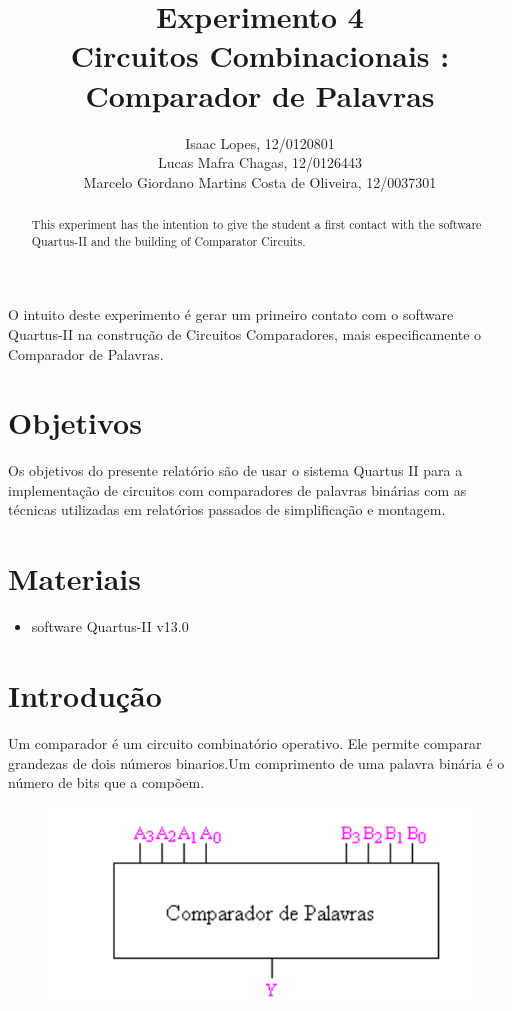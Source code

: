 \documentclass[12pt]{article}
\title{Experimento 4\\
	Circuitos Combinacionais : Comparador de Palavras }
\author{Isaac Lopes, 12/0120801\\
	Lucas Mafra Chagas, 12/0126443 \\
	Marcelo Giordano Martins Costa de Oliveira,  12/0037301
}
\begin{document}
 

\maketitle

 \begin{abstract}
   This experiment has the intention to give the student a first contact with the software Quartus-II and the building of Comparator Circuits.
 \end{abstract}
     
 \begin{resumo} 
  O intuito deste experimento é gerar um primeiro contato com o software Quartus-II na construção de Circuitos Comparadores, mais especificamente o Comparador de Palavras.
 \end{resumo}


\section{Objetivos}
\label{sec:Objetivos}

Os objetivos do presente relatório são de usar o sistema Quartus II para a implementação de circuitos com comparadores de palavras binárias com as técnicas utilizadas em relatórios passados de simplificação e montagem.

\section{Materiais} 
\label{sec:Materiais}

\begin{itemize}
    \item software Quartus-II v13.0
\end{itemize}
\section{Introdução}
\label{sec:Introducao}

Um comparador é um circuito combinatório operativo. Ele permite comparar grandezas de dois números binarios.Um comprimento de uma palavra binária é o número de bits que a compõem.
\begin{figure}[H]
	\centering
	\includegraphics[width=.5\textwidth]{cc1.png}	
\end{figure}
\end{document}
